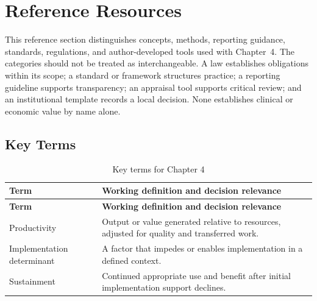 \section{Reference Resources}
\label{sec:comp-ch04-reference}

This reference section distinguishes concepts, methods, reporting guidance,
standards, regulations, and author-developed tools used with Chapter~4. The
categories should not be treated as interchangeable. A law establishes obligations
within its scope; a standard or framework structures practice; a reporting guideline
supports transparency; an appraisal tool supports critical review; and an
institutional template records a local decision. None establishes clinical or
economic value by name alone. 

\subsection{Key Terms}
\begin{longtable}{@{}p{}p{}@{}}
\caption{Key terms for Chapter 4}
\label{tab:comp-ch04-key-terms}\\
\toprule
\textbf{Term} & \textbf{Working definition and decision relevance} \\
\midrule
\endfirsthead
\toprule
\textbf{Term} & \textbf{Working definition and decision relevance} \\
\midrule
\endhead
\bottomrule
\endlastfoot
Productivity & Output or value generated relative to resources, adjusted for quality and transferred work. \\
Implementation determinant & A factor that impedes or enables implementation in a defined context. \\
Sustainment & Continued appropriate use and benefit after initial implementation support declines. \\
\end{longtable}

